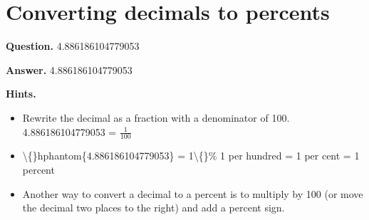 \documentclass{article}
\begin{document}
\section*{Converting decimals to percents}
\textbf{Question.} 4.886186104779053

\textbf{Answer.} 4.886186104779053

\textbf{Hints.}
\begin{itemize}
  \item Rewrite the decimal as a fraction with a denominator of 100.
                    4.886186104779053 = $\frac{1}{100}$
  \item \textbackslash\{\}hphantom\{4.886186104779053\} = 1\textbackslash\{\}\%
                    1 per hundred = 1 per cent = 1 percent
  \item Another way to convert a decimal to a percent is to multiply by 100 (or move the decimal two places to the right) and add a percent sign.
\end{itemize}
\end{document}
